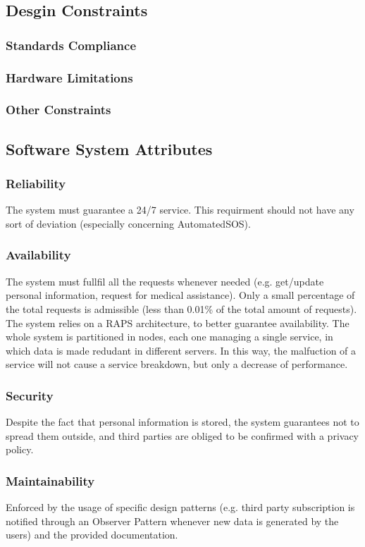 \documentclass[12pt,a4paper]{article}
\begin{document}
	\subsection{Desgin Constraints}
		\subsubsection{Standards Compliance}
		\subsubsection{Hardware Limitations}
		\subsubsection{Other Constraints}
	
	\subsection{Software System Attributes}
		\subsubsection{Reliability}
		The system must guarantee a 24/7 service. This requirment should not have any sort of deviation (especially concerning AutomatedSOS).
		\subsubsection{Availability}
		The system must fullfil all the requests whenever needed (e.g. get/update personal information, request for medical assistance). Only a small percentage of the total requests is admissible (less than 0.01\% of the total amount of requests). The system relies on a RAPS architecture, to better guarantee availability. The whole system is partitioned in nodes, each one managing a single service, in which data is made redudant in different servers. In this way, the malfuction of a service will not cause a service breakdown, but only a decrease of performance.
		\subsubsection{Security}
		Despite the fact that personal information is stored, the system guarantees not to spread them outside, and third parties are obliged to be confirmed with a privacy policy.
		\subsubsection{Maintainability}
		Enforced by the usage of specific design patterns (e.g. third party subscription is notified through an Observer Pattern whenever new data is generated by the users) and the provided documentation.
\end{document}
